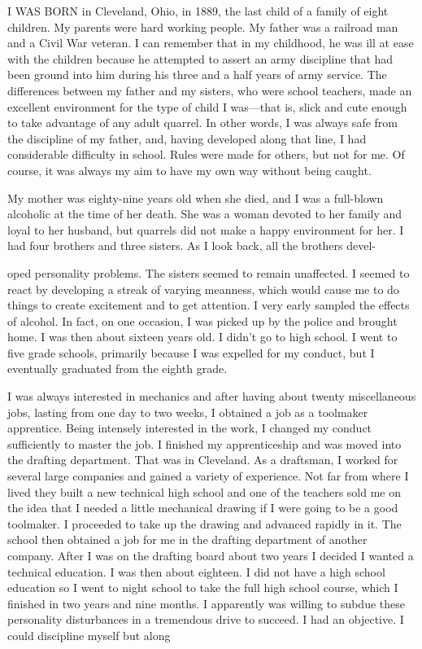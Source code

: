 
\begin{biblechapter}

      I WAS BORN in Cleveland, Ohio, in 1889, the last child of a family of eight children. My parents were hard working people. My father was a railroad man and a Civil War veteran. I can remember that in my childhood, he was ill at ease with the children because he attempted to assert an army discipline that had been ground into him during his three and a half years of army service. The differences between my father and my sisters, who were school teachers, made an excellent environment for the type of child I was—that is, slick and cute enough to take advantage of any adult quarrel. In other words, I was always safe from the discipline of my father, and, having developed along that line, I had considerable difficulty in school. Rules were made for others, but not for me. Of course, it was always my aim to have my own way without being caught.

My mother was eighty-nine years old when she died, and I was a full-blown alcoholic at the time of her death. She was a woman devoted to her family and loyal to her husband, but quarrels did not make a happy environment for her. I had four brothers and three sisters. As I look back, all the brothers devel-

oped personality problems. The sisters seemed to remain unaffected. I seemed to react by developing a streak of varying meanness, which would cause me to do things to create excitement and to get attention. I very early sampled the effects of alcohol. In fact, on one occasion, I was picked up by the police and brought home. I was then about sixteen years old. I didn’t go to high school. I went to five grade schools, primarily because I was expelled for my conduct, but I eventually graduated from the eighth grade.

I was always interested in mechanics and after having about twenty miscellaneous jobs, lasting from one day to two weeks, I obtained a job as a toolmaker apprentice. Being intensely interested in the work, I changed my conduct sufficiently to master the job. I finished my apprenticeship and was moved into the drafting department. That was in Cleveland. As a draftsman, I worked for several large companies and gained a variety of experience. Not far from where I lived they built a new technical high school and one of the teachers sold me on the idea that I needed a little mechanical drawing if I were going to be a good toolmaker. I proceeded to take up the drawing and advanced rapidly in it. The school then obtained a job for me in the drafting department of another company. After I was on the drafting board about two years I decided I wanted a technical education. I was then about eighteen. I did not have a high school education so I went to night school to take the full high school course, which I finished in two years and nine months. I apparently was willing to subdue these personality disturbances in a tremendous drive to succeed. I had an objective. I could discipline myself but along


\end{biblechapter}
